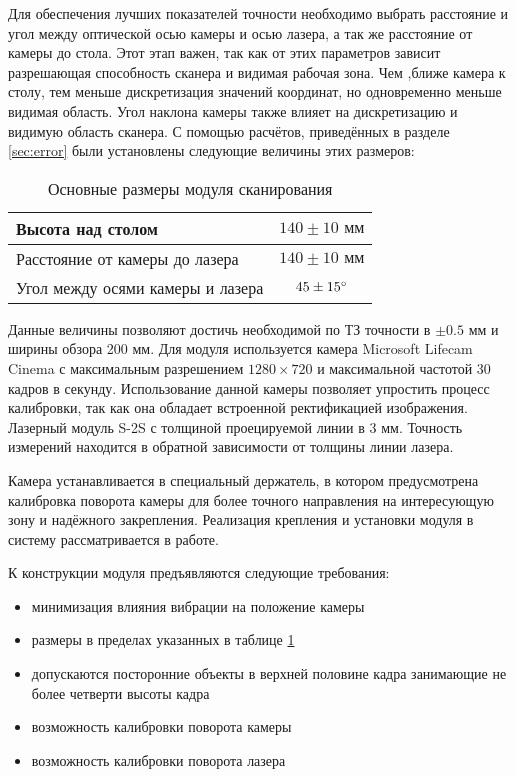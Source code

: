         Для обеспечения лучших показателей точности необходимо выбрать расстояние и угол между оптической осью камеры и осью лазера, а так же расстояние от камеры до стола. Этот этап важен, так как от этих параметров зависит разрешающая способность сканера и видимая рабочая зона. Чем ,ближе камера к столу, тем меньше дискретизация значений координат, но одновременно меньше видимая область. Угол наклона камеры также влияет на дискретизацию и видимую область сканера.
        С помощью расчётов, приведённых в разделе \ref{sec:error} были установлены следующие величины этих размеров:
        \begin{table}[H]
            \centering
            \caption{Основные размеры модуля сканирования}\label{table:dims}
            \begin{tabular}{|l|c|} \hline
                Высота над столом& $ 140  \pm 10 \text{ мм} $\\ \hline
                Расстояние от камеры до лазера& $ 140  \pm 10 \text{ мм} $\\ \hline
                Угол между осями камеры и лазера& $ 45 \pm 15^{\circ} $\\ \hline
            \end{tabular}
        \end{table}
        Данные величины позволяют достичь необходимой по ТЗ точности в $ \pm 0.5 \text{ мм} $ и ширины обзора 200 мм.
        Для модуля используется камера Microsoft Lifecam Cinema с максимальным разрешением $ 1280 
        \times 720 $ и максимальной частотой 30 кадров в секунду. Использование данной камеры позволяет упростить процесс калибровки, так как она обладает встроенной ректификацией изображения. Лазерный модуль S-2S с толщиной проецируемой линии в 3 мм. Точность измерений находится в обратной зависимости от толщины линии лазера.

        Камера устанавливается в специальный держатель, в котором предусмотрена калибровка поворота камеры для более точного направления на интересующую зону и надёжного закрепления. Реализация крепления и установки модуля в систему рассматривается в работе\cite{matsu}. 

        К конструкции модуля предъявляются следующие требования:
        \begin{itemize}
            \item минимизация влияния вибрации на положение камеры
            \item размеры в пределах указанных в таблице \ref{table:dims}
            \item допускаются посторонние объекты в верхней половине кадра занимающие не более четверти высоты кадра
            \item возможность калибровки поворота камеры
            \item возможность калибровки поворота лазера
        \end{itemize}
    
